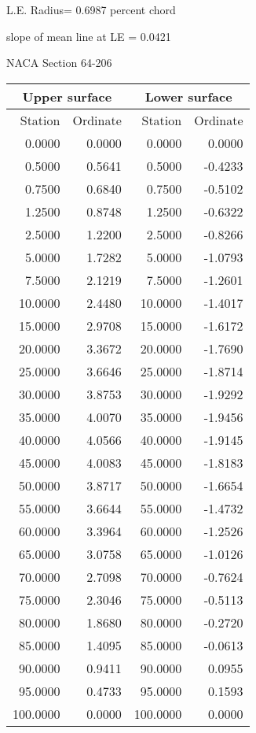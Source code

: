 \documentclass[11pt]{book}
\begin{document}
L.E. Radius=  0.6987 percent chord


 slope of mean line at LE =  0.0421
 \newpage
  \label{s64-206}
 \begin{Large}
 NACA Section 64-206
 \end{Large}
  
 \vspace{8mm}
 \begin{tabular}{|r|r|r|r|} \hline 
 \multicolumn{2}{|c|}{Upper surface} & \multicolumn{2}{|c|}{Lower surface} \\
 \hline
 Station & Ordinate & Station & Ordinate \\
 \hline
0.0000 & 0.0000 & 0.0000 & 0.0000 \\
0.5000 & 0.5641 & 0.5000 & -0.4233 \\
0.7500 & 0.6840 & 0.7500 & -0.5102 \\
1.2500 & 0.8748 & 1.2500 & -0.6322 \\
2.5000 & 1.2200 & 2.5000 & -0.8266 \\
5.0000 & 1.7282 & 5.0000 & -1.0793 \\
7.5000 & 2.1219 & 7.5000 & -1.2601 \\
10.0000 & 2.4480 & 10.0000 & -1.4017 \\
15.0000 & 2.9708 & 15.0000 & -1.6172 \\
20.0000 & 3.3672 & 20.0000 & -1.7690 \\
25.0000 & 3.6646 & 25.0000 & -1.8714 \\
30.0000 & 3.8753 & 30.0000 & -1.9292 \\
35.0000 & 4.0070 & 35.0000 & -1.9456 \\
40.0000 & 4.0566 & 40.0000 & -1.9145 \\
45.0000 & 4.0083 & 45.0000 & -1.8183 \\
50.0000 & 3.8717 & 50.0000 & -1.6654 \\
55.0000 & 3.6644 & 55.0000 & -1.4732 \\
60.0000 & 3.3964 & 60.0000 & -1.2526 \\
65.0000 & 3.0758 & 65.0000 & -1.0126 \\
70.0000 & 2.7098 & 70.0000 & -0.7624 \\
75.0000 & 2.3046 & 75.0000 & -0.5113 \\
80.0000 & 1.8680 & 80.0000 & -0.2720 \\
85.0000 & 1.4095 & 85.0000 & -0.0613 \\
90.0000 & 0.9411 & 90.0000 & 0.0955 \\
95.0000 & 0.4733 & 95.0000 & 0.1593 \\
100.0000 & 0.0000 & 100.0000 & 0.0000 \\
 \hline 
 \end{tabular}
\end{document}
